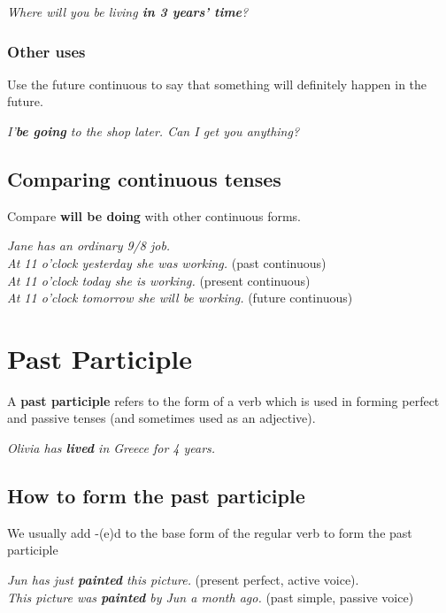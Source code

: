 \documentclass[hidelinks,10pt,a4paper]{article}
\begin{document}
\begin{center}
	\textit{Where will you be living \textbf{in 3 years' time}? }
\end{center}

\subsubsection{Other uses}
Use the future continuous to say that something will definitely happen in the future.

\begin{center}
	\textit{I'\textbf{be going} to the shop later. Can I get you anything?}
\end{center}

\subsection{Comparing continuous tenses}
Compare \textbf{will be doing} with other continuous forms.

\begin{center}
	\textit{Jane has an ordinary 9/8 job. \\
	At 11 o'clock yesterday she was working.} (past continuous) \\
	\textit{At 11 o'clock today she is working.} (present continuous) \\
	\textit{At 11 o'clock tomorrow she will be working.} (future continuous)
\end{center}

\section{Past Participle}
A \textbf{past participle} refers to the form of a verb which is used in forming perfect and passive tenses (and sometimes used as an adjective).

\begin{center}
	\textit{Olivia has \textbf{lived} in Greece for 4 years.}
\end{center}

\subsection{How to form the past participle}
We usually add -(e)d to the base form of the regular verb to form the past participle

\begin{center}
	\textit{Jun has just \textbf{painted} this picture.} (present perfect, active voice). \\
	\textit{This picture was \textbf{painted} by Jun a month ago.} (past simple, passive voice)
\end{center}
\end{document}
